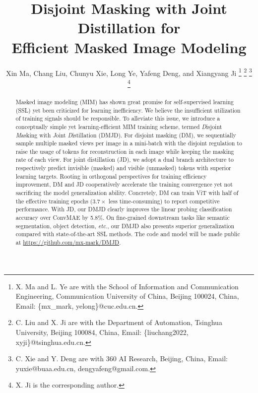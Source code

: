 \documentclass[lettersize,journal]{IEEEtran}
\begin{document}
\title{Disjoint Masking with Joint Distillation for \\ Efficient Masked Image Modeling}

\author{Xin Ma, 
        Chang Liu, 
        Chunyu Xie, 
        Long Ye, 
        Yafeng Deng, 
        and Xiangyang Ji
\thanks{X. Ma and L. Ye are with the School of Information and Communication Engineering, Communication University of China, Beijing 100024, China, Email: \{mx\_mark, yelong\}@cuc.edu.cn.}
\thanks{C. Liu and X. Ji are with the Department of Automation, Tsinghua University, Beijing 100084, China, Email: \{liuchang2022, xyji\}@tsinghua.edu.cn.} 
\thanks{C. Xie and Y. Deng are with 360 AI Research, Beijing, China, Email: yuxie@buaa.edu.cn, dengyafeng@gmail.com.}
\thanks{X. Ji is the corresponding author.}
}

\maketitle
 
\begin{abstract}
Masked image modeling (MIM) has shown great promise for self-supervised learning (SSL) yet been criticized for learning inefficiency.
We believe the insufficient utilization of training signals should be responsible.
To alleviate this issue, we introduce a conceptually simple yet learning-efficient MIM training scheme, termed \textit{D}isjoint \textit{M}asking with \textit{J}oint \textit{D}istillation (DMJD).
For disjoint masking (DM), we sequentially sample multiple masked views per image in a mini-batch with the disjoint regulation to raise the usage of tokens for reconstruction in each image while keeping the masking rate of each view.
For joint distillation (JD), we adopt a dual branch architecture to respectively predict invisible (masked) and visible (unmasked) tokens with superior learning targets.
Rooting in orthogonal perspectives for training efficiency improvement, DM and JD cooperatively accelerate the training convergence yet not sacrificing the model generalization ability.
Concretely, DM can train ViT with half of the effective training epochs ($3.7\times$ less time-consuming) to report competitive performance. With JD, our DMJD clearly improves the linear probing classification accuracy over ConvMAE by 5.8$\%$. 
On fine-grained downstream tasks like semantic segmentation, object detection, \textit{etc.}, our DMJD also presents superior generalization compared with state-of-the-art SSL methods.
The code and model will be made public at \href{https://github.com/mx-mark/DMJD}{https://github.com/mx-mark/DMJD}.
\end{abstract}
\end{document}

